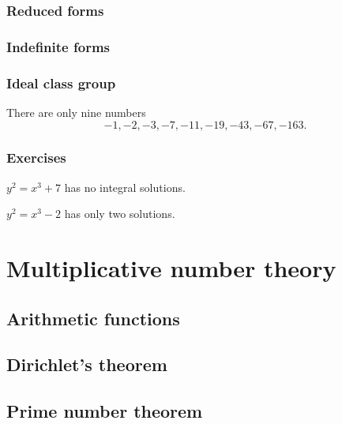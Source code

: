 \documentclass{../../large}
\begin{document}
\section{Reduced forms}
\section{Indefinite forms}

\section{Ideal class group}

\begin{prb}
There are only nine numbers
\[-1,-2,-3,-7,-11,-19,-43,-67,-163.\]
\end{prb}

\section*{Exercises}
\begin{prb}
\begin{parts}
\item $y^2=x^3+7$ has no integral solutions.
\end{parts}
\end{prb}

\begin{prb}
\begin{parts}
\item $y^2=x^3-2$ has only two solutions.
\end{parts}
\end{prb}









\part{Multiplicative number theory}
\chapter{Arithmetic functions}
\chapter{Dirichlet's theorem}
\chapter{Prime number theorem}
\end{document}

